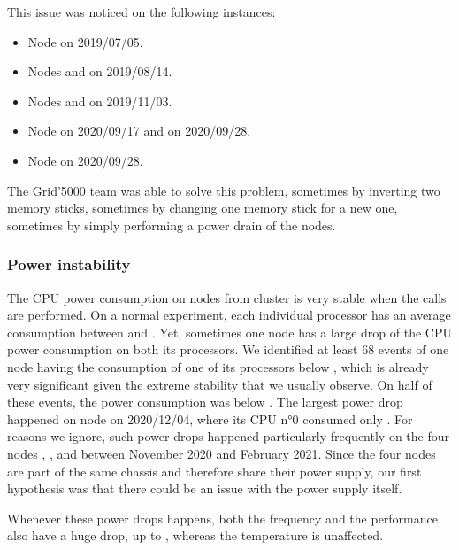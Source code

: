                 This issue was noticed on the following instances:
                \begin{itemize}
                    \item Node  on 2019/07/05.
                    \item Nodes  and  on 2019/08/14.
                    \item Nodes  and  on 2019/11/03.
                    \item Node  on 2020/09/17 and on 2020/09/28.
                    \item Node  on 2020/09/28.
                \end{itemize}

                The Grid'5000 team was able to solve this problem, sometimes by inverting two memory sticks, sometimes
                by changing one memory stick for a new one, sometimes by simply performing a power drain of the nodes.

            \subsubsection{Power instability}%

                The CPU power consumption on nodes from cluster \dahu is very stable when the \dgemm calls are
                performed. On a normal experiment, each individual processor has an average consumption between
                 and . Yet, sometimes one node has a large drop of the CPU
                power consumption on both its processors. We identified at least 68 events of one node having the
                consumption of one of its processors below , which is already very significant given the
                extreme stability that we usually observe. On half of these events, the power consumption was below
                . The largest power drop happened on node  on 2020/12/04, where its CPU
                n°0 consumed only . For reasons we ignore, such power drops happened particularly
                frequently on the four nodes , ,  and  between
                November 2020 and February 2021. Since the four nodes are part of the same chassis and therefore share
                their power supply, our first hypothesis was that there could be an issue with the power supply itself.

                Whenever these power drops happens, both the frequency and the \dgemm performance also have a huge drop,
                up to , whereas the temperature is unaffected.

